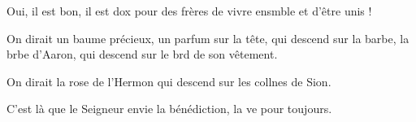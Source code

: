 \item Oui, il est bon, il est dox pour des frères\psstar{} de vivre ensmble et d’être unis !
\item On dirait un baume précieux, un parfum sur la tête,\pscross{} qui descend sur la barbe, la brbe d’Aaron,\psstar{} qui descend sur le brd de son vêtement.
\item On dirait la rose de l’Hermon\psstar{} qui descend sur les collnes de Sion. 
\item C’est là que le Seigneur envie la bénédiction,\psstar{} la ve pour toujours.